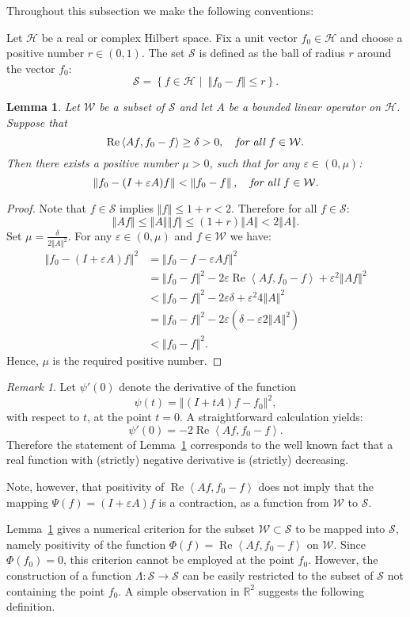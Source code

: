 \documentclass{tran-l}
\newtheorem{lem}[thm]{Lemma}
\theoremstyle{definition}
\theoremstyle{remark}
\newtheorem{rem}[thm]{Remark}
\numberwithin{equation}{subsection}
\DeclareMathOperator{\RE}{Re}
\newcommand{\eps}{\varepsilon}
\newcommand{\To}{\longrightarrow}
\newcommand{\h}{\mathcal{H}}
\newcommand{\s}{\mathcal{S}}
\newcommand{\W}{\mathcal{W}}
\newcommand{\Real}{\mathbb{R}}
\newcommand{\set}[1]{\left\{#1\right\}}
\newcommand{\seq}[1]{\left<#1\right>}
\newcommand{\norm}[1]{\left\Vert#1\right\Vert}
\begin{document}
Throughout this subsection we make the following conventions:

Let $\h$ be a real or complex Hilbert space. Fix a unit vector $f_0\in\h$ and choose a positive number $r\in(0,1)$. The set $\s$ is defined as the ball of radius $r$ around the vector $f_0$:
\[ \s = \set{f\in\h\,\,|\,\,\, \norm{f_0-f}\leq r}. \]

\begin{lem} \label{l:APPROX}
Let $\W$ be a subset of $\s$ and let $A$ be a bounded linear operator on $\h$. Suppose that
\[ \RE\seq{A{f},f_0-f}\geq\delta>0,
   \quad \text{\em for all $f\in\W$.} \]
Then there exists a positive number $\mu>0$, such that for any $\eps\in(0,\mu)$:
\[ \norm{f_0 - (I+\eps A)f} < \norm{f_0 - f},
   \quad \text{\em for all $f\in\W$.} \]
\end{lem}

\begin{proof}
Note that $f\in\s$ implies $\norm{f} \leq 1 + r < 2$. Therefore for all $f\in\s$:
\[ \norm{A{f}} \leq \norm{A}\norm{f} \leq (1+r) \norm{A} < 2\norm{A}. \]
Set $\mu=\tfrac{\delta}{2\norm{A}^2}$. For any $\eps\in(0,\mu)$ and $f\in\W$ we have:
\begin{align*}
  \norm{f_0 - (I+\eps A)f}^2 &= \norm{f_0-f - \eps A f}^2 \\ & =
  \norm{f_0-f}^2 - 2\eps\RE\seq{A{f},f_0-f} + \eps^2\norm{A{f}}^2 \\
  & < \norm{f_0-f}^2 - 2\eps\delta + \eps^2 4\norm{A}^2 \\ & =
  \norm{f_0-f}^2 - 2\eps(\delta - \eps 2\norm{A}^2) \\ & <
  \norm{f_0-f}^2.
\end{align*}
Hence, $\mu$ is the required positive number.
\end{proof}

\begin{rem}
Let $\psi'(0)$ denote the derivative of the function
\[ \psi(t)=\norm{(I+t{A})f-f_0}^2, \]
with respect to $t$, at the point $t=0$. A straightforward calculation yields:
\[ \psi'(0)=-2\RE\seq{A{f},f_0-f}. \]
Therefore the statement of Lemma~\ref{l:APPROX} corresponds to the well known fact that a real function with (strictly) negative derivative is (strictly) decreasing.

Note, however, that positivity of $\RE\seq{A{f},f_0-f}$ does not imply that the mapping $\Psi(f)=(I+\eps A)f$ is a contraction, as a function from $\W$ to $\s$.
\end{rem}

Lemma~\ref{l:APPROX} gives a numerical criterion for the subset $\W\subset\s$ to be mapped into $\s$, namely positivity of the function $\Phi(f)=\RE\seq{A{f},f_0-f}$ on $\W$. Since $\Phi(f_0)=0$, this criterion cannot be employed at the point $f_0$. However, the construction of a function $\Lambda\colon\s\To\s$ can be easily restricted to the subset of $\s$ not containing the point $f_0$. A simple observation in $\Real^2$ suggests the following definition.
\end{document}
